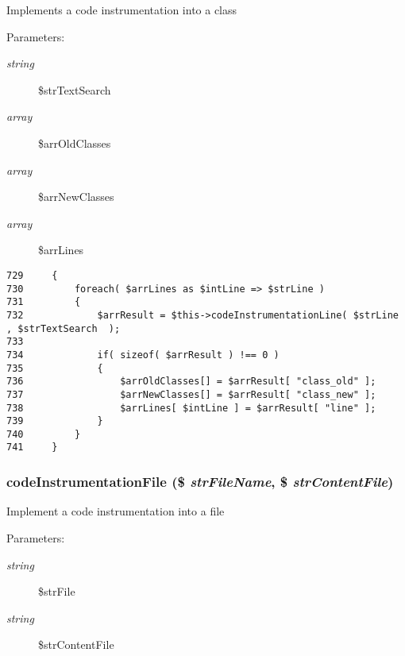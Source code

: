 Implements a code instrumentation into a class

\begin{Desc}
\item[Parameters:]
\begin{description}
\item[{\em string}]\$strTextSearch \item[{\em array}]\$arrOldClasses \item[{\em array}]\$arrNewClasses \item[{\em array}]\$arrLines \end{description}
\end{Desc}


\begin{Code}\begin{verbatim}729     {
730         foreach( $arrLines as $intLine => $strLine )
731         {
732             $arrResult = $this->codeInstrumentationLine( $strLine , $strTextSearch  );
733 
734             if( sizeof( $arrResult ) !== 0 )
735             {
736                 $arrOldClasses[] = $arrResult[ "class_old" ];
737                 $arrNewClasses[] = $arrResult[ "class_new" ];
738                 $arrLines[ $intLine ] = $arrResult[ "line" ];
739             }
740         }
741     }
\end{verbatim}
\end{Code}


\hypertarget{class_code_to_diagram_39823f54aa950aa83d7f0786ae2d2922}{
\subsubsection[{codeInstrumentationFile}]{\setlength{\rightskip}{0pt plus 5cm}codeInstrumentationFile (\$ {\em strFileName}, \/  \$ {\em strContentFile})}}
\label{class_code_to_diagram_39823f54aa950aa83d7f0786ae2d2922}


Implement a code instrumentation into a file

\begin{Desc}
\item[Parameters:]
\begin{description}
\item[{\em string}]\$strFile \item[{\em string}]\$strContentFile \end{description}
\end{Desc}


